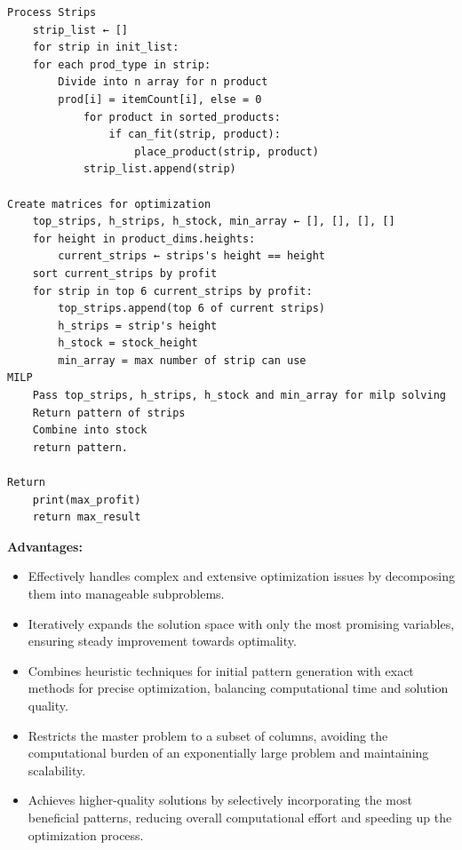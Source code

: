 \documentclass[a4paper]{article}
\begin{document}
\begin{itemize}
\begin{itemize}
\begin{verbatim}
Process Strips
    strip_list ← []
    for strip in init_list:
	for each prod_type in strip:
	    Divide into n array for n product
	    prod[i] = itemCount[i], else = 0
            for product in sorted_products:
                if can_fit(strip, product):
                    place_product(strip, product)
            strip_list.append(strip)

Create matrices for optimization
    top_strips, h_strips, h_stock, min_array ← [], [], [], []
    for height in product_dims.heights:
    	current_strips ← strips's height == height
	sort current_strips by profit
	for strip in top 6 current_strips by profit:
	    top_strips.append(top 6 of current strips) 
	    h_strips = strip's height
	    h_stock = stock_height
	    min_array = max number of strip can use
MILP
    Pass top_strips, h_strips, h_stock and min_array for milp solving
    Return pattern of strips
    Combine into stock
    return pattern.

Return
    print(max_profit)
    return max_result
\end{verbatim}
\end{itemize}
\end{itemize}


\vspace{0.25cm}
\noindent\textbf{Advantages:} 
\begin{itemize}
    \item Effectively handles complex and extensive optimization issues by decomposing them into manageable subproblems.
    \item Iteratively expands the solution space with only the most promising variables, ensuring steady improvement towards optimality.
    \item Combines heuristic techniques for initial pattern generation with exact methods for precise optimization, balancing computational time and solution quality.
    \item Restricts the master problem to a subset of columns, avoiding the computational burden of an exponentially large problem and maintaining scalability.
    \item Achieves higher-quality solutions by selectively incorporating the most beneficial patterns, reducing overall computational effort and speeding up the optimization process.
\end{itemize}

\vspace{0.35cm}
\end{document}
